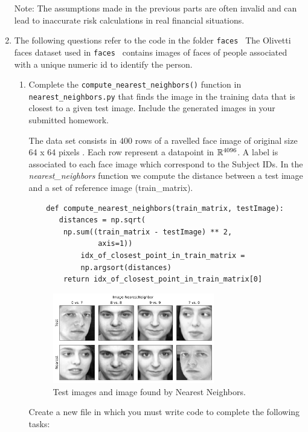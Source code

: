 \documentclass[12pt,twoside]{article}
\begin{document}
\begin{enumerate}
\begin{enumerate}
  \end{enumerate}
  Note: The assumptions made in the previous parts are often
  invalid and can lead to inaccurate risk calculations in real
  financial situations. 
  
  \newpage
  \item The following questions refer to the code in the folder {\tt faces }
  The Olivetti faces dataset used in  {\tt faces }  contains images of faces of people associated with a unique numeric id to identify the person.

  	\begin{enumerate}
		\item Complete the \verb|compute_nearest_neighbors()| function in \verb|nearest_neighbors.py| that finds the image in the training data that is closest to a given test image.  Include the generated images in your submitted homework.


		The data set consists in $400$ rows of a ravelled face image of original size 64 x 64 pixels . Each row represent a datapoint in $\mathbb{R}^{4096}$.
		A label is associated to each face image which correspond to the Subject IDs.
		In the \emph{nearest\_neighbors} function we compute the distance between a test image and a set of reference image (train\_matrix).

\begin{verbatim}
	def compute_nearest_neighbors(train_matrix, testImage):
	   distances = np.sqrt(
	   	np.sum((train_matrix - testImage) ** 2, 
	   			axis=1))
    	    idx_of_closest_point_in_train_matrix = 
	    	np.argsort(distances)
	    return idx_of_closest_point_in_train_matrix[0]
\end{verbatim}


	\begin{figure}[H]
		\centering
		\includegraphics[width=200pt]{figures/Image-NearestNeighbor}
		\caption{Test images and image found by Nearest Neighbors.}
		\label{fig5}
	\end{figure}


\vspace{0.5cm}Create a new file  in which
you must write code to complete the following tasks:



\end{enumerate}
\end{enumerate}
\end{document}
